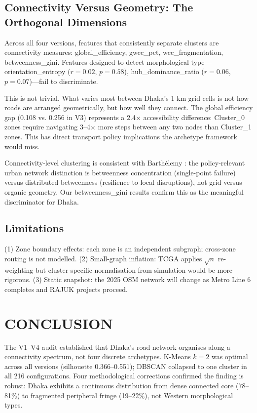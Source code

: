 \documentclass[sigconf, nonacm]{acmart}
\begin{document}
\subsection{Connectivity Versus Geometry: The Orthogonal Dimensions}

Across all four versions, features that consistently separate clusters are connectivity measures: global\_\allowbreak efficiency, gwcc\_\allowbreak pct, wcc\_\allowbreak fragmentation, betweenness\_\allowbreak gini. Features designed to detect morphological type—orientation\_\allowbreak entropy ($r = 0.02$, $p = 0.58$), hub\_\allowbreak dominance\_\allowbreak ratio ($r = 0.06$, $p = 0.07$)—fail to discriminate.

This is not trivial. What varies most between Dhaka's 1 km grid cells is not how roads are arranged geometrically, but how well they connect. The global efficiency gap (0.108 vs. 0.256 in V3) represents a 2.4$\times$ accessibility difference: Cluster\_0 zones require navigating 3--4$\times$ more steps between any two nodes than Cluster\_1 zones. This has direct transport policy implications the archetype framework would miss.

Connectivity-level clustering is consistent with Barthélemy \cite{barthelemy2011}: the policy-relevant urban network distinction is betweenness concentration (single-point failure) versus distributed betweenness (resilience to local disruptions), not grid versus organic geometry. Our betweenness\_gini results confirm this as the meaningful discriminator for Dhaka.

\subsection{Limitations}

(1) Zone boundary effects: each zone is an independent subgraph; cross-zone routing is not modelled. (2) Small-graph inflation: TCGA applies $\sqrt{n}$ re-weighting but cluster-specific normalisation from simulation would be more rigorous. (3) Static snapshot: the 2025 OSM network will change as Metro Line 6 completes and RAJUK projects proceed.

\section{CONCLUSION}

The V1--V4 audit established that Dhaka's road network organises along a connectivity spectrum, not four discrete archetypes. K-Means $k = 2$ was optimal across all versions (silhouette 0.366--0.551); DBSCAN collapsed to one cluster in all 216 configurations. Four methodological corrections confirmed the finding is robust: Dhaka exhibits a continuous distribution from dense connected core (78--81\%) to fragmented peripheral fringe (19--22\%), not Western morphological types.
\end{document}

